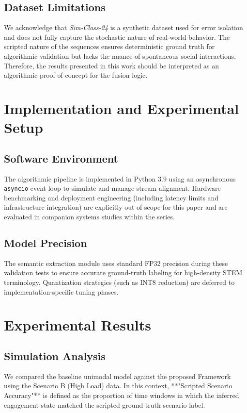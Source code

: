 \documentclass[conference]{IEEEtran}
\begin{document}
\subsection{Dataset Limitations}
We acknowledge that \textit{Sim-Class-24} is a synthetic dataset used for error isolation and does not fully capture the stochastic nature of real-world behavior. The scripted nature of the sequences ensures deterministic ground truth for algorithmic validation but lacks the nuance of spontaneous social interactions. Therefore, the results presented in this work should be interpreted as an algorithmic proof-of-concept for the fusion logic.

\section{Implementation and Experimental Setup}

\subsection{Software Environment}
The algorithmic pipeline is implemented in Python 3.9 using an asynchronous \texttt{asyncio} event loop to simulate and manage stream alignment. Hardware benchmarking and deployment engineering (including latency limits and infrastructure integration) are explicitly out of scope for this paper and are evaluated in companion systems studies within the series.

\subsection{Model Precision}
The semantic extraction module uses standard FP32 precision during these validation tests to ensure accurate ground-truth labeling for high-density STEM terminology. Quantization strategies (such as INT8 reduction) are deferred to implementation-specific tuning phases.

\section{Experimental Results}

\subsection{Simulation Analysis}
We compared the baseline unimodal model against the proposed Framework using the Scenario B (High Load) data. In this context, **"Scripted Scenario Accuracy"** is defined as the proportion of time windows in which the inferred engagement state matched the scripted ground-truth scenario label.
\end{document}
